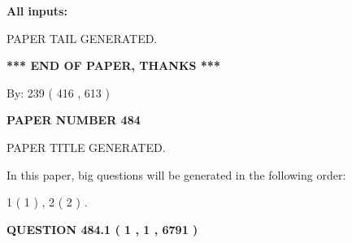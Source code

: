 \documentclass{ctexart}
\begin{document}
   
   
   
\noindent{}
   
   
   
   
\noindent\vspace{0.1in}\hspace{-0.08in} {\textbf{\Large{All inputs: }}}
   
   
   
   
   
   
 \vspace{0.2in}
 
   
   
\vspace{2.0in} PAPER TAIL GENERATED.
   
   
   
   
\vspace{1.0in} 
{\textbf{\large{ *** END OF PAPER, THANKS *** }}} 
   
   
\hspace{1.0in} By: 
 239 ( 416 ,  613 )
   
   
   
   
\newpage 
\setcounter{page}{ 
   484001 } 
   
   
   
   
 {\textbf{ \Large{ PAPER NUMBER  484  }}}
   
   
\vspace{0.2in}
   
   
   
   
   
   
   
   
 \vspace{0.2in}
 
 
 
 
   
   
 PAPER TITLE GENERATED.
   
   
   
\vspace{0.2in}
   
In this paper, big questions will be generated in the following order: 
   
   
   1 ( 1 )
 ,
   2 ( 2 )
 .
  
\vspace{0.2in}
  
{\textbf{\Large{QUESTION
484.1 
 ( 1 , 1 , 6791 )
}}}
  
\end{document}
